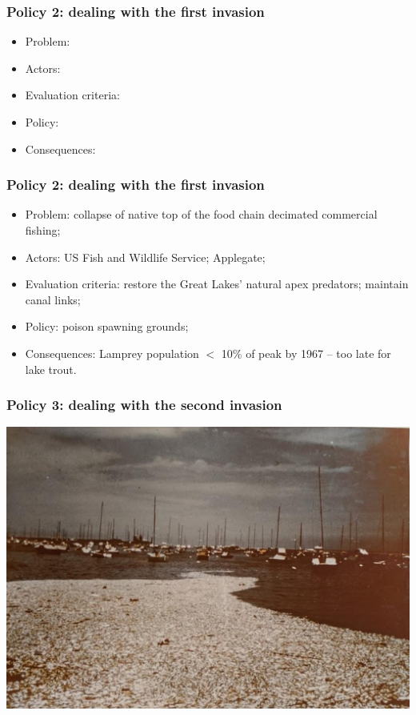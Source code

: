 \documentclass[aspectratio=169]{beamer}
\theoremstyle{principle}
\begin{document}
\begin{frame}
\frametitle{Policy 2: dealing with the first invasion}

\begin{itemize}
\item Problem: 
\bigskip
\bigskip
\item Actors: 
\bigskip
\bigskip
\item Evaluation criteria: 
\bigskip
\bigskip
\item Policy:
\bigskip
\bigskip
\item Consequences: 
\end{itemize}

\end{frame}

\begin{frame}
\frametitle{Policy 2: dealing with the first invasion}

\begin{itemize}
\item Problem: collapse of native top of the food chain decimated commercial fishing;
\bigskip
\bigskip
\item Actors: US Fish and Wildlife Service; Applegate;
\bigskip
\bigskip
\item Evaluation criteria: restore the Great Lakes' natural apex predators; maintain canal links;
\bigskip
\bigskip
\item Policy: poison spawning grounds;
\bigskip
\bigskip
\item Consequences: Lamprey population $<$ 10\% of peak by 1967 -- too late for lake trout.
\end{itemize}

\end{frame}

\begin{frame}
\frametitle{Policy 3: dealing with the second invasion}

    \begin{center}
     \includegraphics[scale=0.35]{chicago_alewife.png}
     \end{center}

\end{frame}
\end{document}

